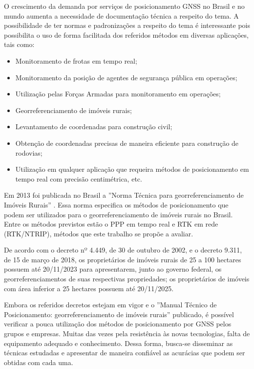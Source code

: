 O crescimento da demanda por serviços de posicionamento GNSS no Brasil e no mundo aumenta a necessidade de documentação técnica a respeito do tema. A possibilidade de ter normas e padronizações a respeito do tema é interessante pois possibilita o uso de forma facilitada dos referidos métodos em diversas aplicações, tais como:

\begin{itemize}
    \item Monitoramento de frotas em tempo real;
    \item Monitoramento da posição de agentes de segurança pública em operações;
    \item Utilização pelas Forças Armadas para monitoramento em operações;
    \item Georreferenciamento de imóveis rurais;
    \item Levantamento de coordenadas para construção civil;
    \item Obtenção de coordenadas precisas de maneira eficiente para construção de rodovias;
    \item Utilização em qualquer aplicação que requeira métodos de posicionamento em tempo real com precisão centimétrica, etc.
\end{itemize}



Em 2013 foi publicada no Brasil a ''Norma Técnica para georreferenciamento de Imóveis Rurais'' \citep{INCRA}. Essa norma especifica os métodos de posicionamento que podem ser utilizados para o georreferenciamento de imóveis rurais no Brasil. Entre os métodos previstos estão o PPP em tempo real e RTK em rede (RTK/NTRIP), métodos que este trabalho se propõe a avaliar.

De acordo com o decreto nº 4.449, de 30 de outubro de 2002, e o decreto 9.311, de 15 de março de 2018, os proprietários de imóveis rurais de 25 a 100 hectares possuem até 20/11/2023 para apresentarem, junto ao governo federal, os georreferenciamentos de suas respectivas propriedades; os proprietários de imóveis com área inferior a 25 hectares possuem até 20/11/2025.

Embora os referidos decretos estejam em vigor e o ''Manual Técnico de Posicionamento: georreferenciamento de imóveis rurais'' publicado, é possível verificar a pouca utilização dos métodos de posicionamento por GNSS pelos grupos e empresas. Muitas das vezes pela resistência às novas tecnologias, falta de equipamento adequado e conhecimento. Dessa forma, busca-se disseminar as técnicas estudadas e apresentar de maneira confiável as acurácias que podem ser obtidas com cada uma.

